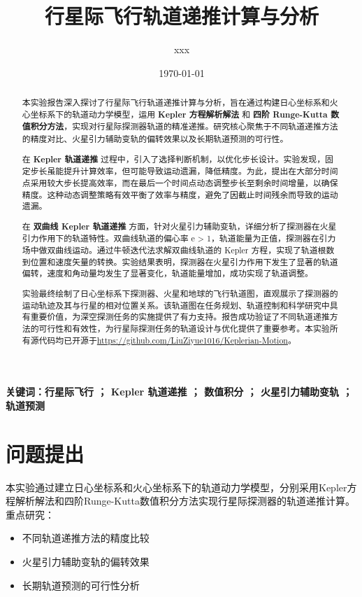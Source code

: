 \documentclass[12pt,a4paper]{article}
\title{行星际飞行轨道递推计算与分析}
\author{xxx}
\date{\today}
\begin{document}
\maketitle

\begin{abstract}
    本实验报告深入探讨了行星际飞行轨道递推计算与分析，旨在通过构建日心坐标系和火心坐标系下的轨道动力学模型，运用 \textbf{Kepler 方程解析解法} 和 \textbf{四阶 Runge-Kutta 数值积分方法}，实现对行星际探测器轨道的精准递推。研究核心聚焦于不同轨道递推方法的精度对比、火星引力辅助变轨的偏转效果以及长期轨道预测的可行性。

    在 \textbf{Kepler 轨道递推} 过程中，引入了选择判断机制，以优化步长设计。实验发现，固定步长虽能提升计算效率，但可能导致运动遗漏，降低精度。为此，提出在大部分时间点采用较大步长提高效率，而在最后一个时间点动态调整步长至剩余时间增量，以确保精度。这种动态调整策略有效平衡了效率与精度，避免了因截止时间残余而导致的运动遗漏。

    在 \textbf{双曲线 Kepler 轨道递推} 方面，针对火星引力辅助变轨，详细分析了探测器在火星引力作用下的轨道特性。双曲线轨道的偏心率 e > 1，轨道能量为正值，探测器在引力场中做双曲线运动。通过牛顿迭代法求解双曲线轨道的 Kepler 方程，实现了轨道根数到位置和速度矢量的转换。实验结果表明，探测器在火星引力作用下发生了显著的轨道偏转，速度和角动量均发生了显著变化，轨道能量增加，成功实现了轨道调整。

    实验最终绘制了日心坐标系下探测器、火星和地球的飞行轨道图，直观展示了探测器的运动轨迹及其与行星的相对位置关系。该轨道图在任务规划、轨道控制和科学研究中具有重要价值，为深空探测任务的实施提供了有力支持。报告成功验证了不同轨道递推方法的可行性和有效性，为行星际探测任务的轨道设计与优化提供了重要参考。本实验所有源代码均已开源于\url{https://github.com/LiuZiyue1016/Keplerian-Motion}。
\end{abstract}

\textbf{关键词：行星际飞行 ； Kepler 轨道递推 ； 数值积分 ； 火星引力辅助变轨 ； 轨道预测}

\section{问题提出}
本实验通过建立日心坐标系和火心坐标系下的轨道动力学模型，分别采用Kepler方程解析解法和四阶Runge-Kutta数值积分方法实现行星际探测器的轨道递推计算。重点研究：
\begin{itemize}
    \item 不同轨道递推方法的精度比较
    \item 火星引力辅助变轨的偏转效果
    \item 长期轨道预测的可行性分析
\end{itemize}
\end{document}
